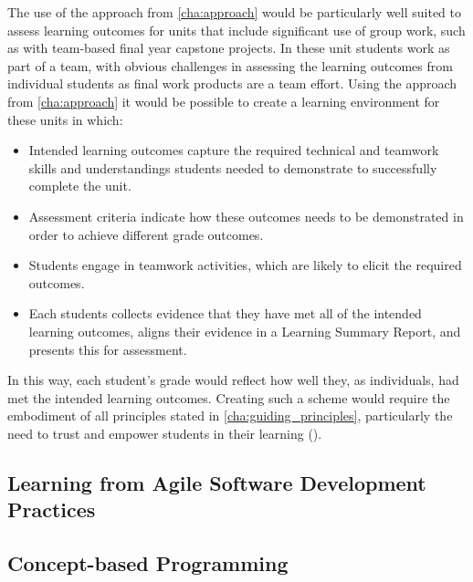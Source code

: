 The use of the approach from \cref{cha:approach} would be particularly well suited to assess learning outcomes for units that include significant use of group work, such as with team-based final year capstone projects. In these unit students work as part of a team, with obvious challenges in assessing the learning outcomes from individual students as final work products are a team effort. Using the approach from \cref{cha:approach} it would be possible to create a learning environment for these units in which:
\begin{itemize}[noitemsep,nolistsep]
	\item Intended learning outcomes capture the required technical and teamwork skills and understandings students needed to demonstrate to successfully complete the unit.
	\item Assessment criteria indicate how these outcomes needs to be demonstrated in order to achieve different grade outcomes.
	\item Students engage in teamwork activities, which are likely to elicit the required outcomes.
	\item Each students collects evidence that they have met all of the intended learning outcomes, aligns their evidence in a Learning Summary Report, and presents this for assessment.
\end{itemize}

In this way, each student's grade would reflect how well they, as individuals, had met the intended learning outcomes. Creating such a scheme would require the embodiment of all principles stated in \cref{cha:guiding_principles}, particularly the need to trust and empower students in their learning (). 






\subsection{Learning from Agile Software Development Practices} %
\label{sub:learning_from_agile_software_development_practices}


\subsection{Concept-based Programming} %
\label{sub:concept_based_programming}

